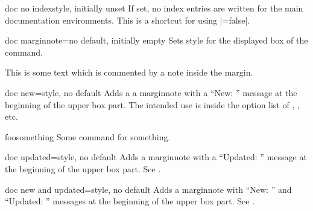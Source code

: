 \begin{docTcbKey}[][doc new={2020-04-22}]{doc no index}{}{style, initially unset}
  If set, no index entries are written for the main documentation
  environments. This is a shortcut for using |=false|.
\end{docTcbKey}



\begin{docTcbKey}[][doc new=2014-09-19]{doc marginnote}{=}{no default, initially empty}
  Sets style  for the displayed box of the  command.
\begin{dispExample}
%
This is some text
which is commented by a note inside the margin.
\end{dispExample}
\end{docTcbKey}

\begin{docTcbKey}[][doc new=2014-09-19]{doc new}{=}{style, no default}
  Adds a a marginnote with a \enquote{New: } message at the beginning of
  the upper box part. The intended use is inside the option list of
  , , etc.
  \makeatletter\renewcommand*{\tcbdocnew}[1]{\kvtcb@text@new: #1}\makeatother%
\begin{dispExample}
\begin{docCommand}[doc new=2000-01-01]{foosomething}{}
Some command for something.
\end{docCommand}
\end{dispExample}
\end{docTcbKey}


\begin{docTcbKey}[][doc new=2014-09-19]{doc updated}{=}{style, no default}
  Adds a marginnote with a \enquote{Updated: } message at the beginning of
  the upper box part. See .
\end{docTcbKey}


\begin{docTcbKey}[][doc new=2014-09-19]{doc new and updated}{=}{style, no default}
  Adds a marginnote with \enquote{New: } and \enquote{Updated: } messages at the beginning of
  the upper box part. See .
\end{docTcbKey}



